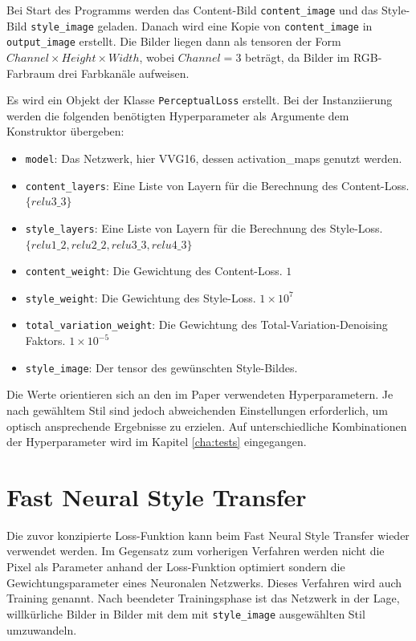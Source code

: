 Bei Start des Programms werden das Content-Bild \texttt{content_image} und das Style-Bild \texttt{style_image} geladen. Danach wird eine Kopie von \texttt{content_image} in \texttt{output_image} erstellt. Die Bilder liegen dann als \gls{tensor}en der Form $ Channel \times Height \times Width $, wobei $ Channel = 3 $ beträgt, da Bilder im RGB-Farbraum drei Farbkanäle aufweisen.

Es wird ein Objekt der Klasse \texttt{PerceptualLoss} erstellt. Bei der Instanziierung werden die folgenden benötigten Hyperparameter als Argumente dem Konstruktor übergeben:

\begin{itemize}
	\item \texttt{model}: Das Netzwerk, hier VVG16, dessen \gls{activation_map}s genutzt werden.
	\item \texttt{content_layers}: Eine Liste von Layern für die Berechnung des Content-Loss.\\ $ \{ relu3\_3 \} $
	\item \texttt{style_layers}: Eine Liste von Layern für die Berechnung des Style-Loss.\\ $ \{ relu1\_2, relu2\_2, relu3\_3, relu4\_3 \} $
	\item \texttt{content_weight}: Die Gewichtung des Content-Loss. $ 1 $ 
	\item \texttt{style_weight}: Die Gewichtung des Style-Loss. $ 1 \times 10^{7} $
	\item \texttt{total_variation_weight}: Die Gewichtung des Total-Variation-Denoising Faktors. $ 1 \times 10^{-5} $
	\item \texttt{style_image}: Der \gls{tensor} des gewünschten Style-Bildes.
\end{itemize}

Die Werte orientieren sich an den im Paper \cite{DBLP:journals/corr/JohnsonAL16} verwendeten Hyperparametern. Je nach gewähltem Stil sind jedoch abweichenden Einstellungen erforderlich, um optisch ansprechende Ergebnisse zu erzielen. Auf unterschiedliche Kombinationen der Hyperparameter wird im Kapitel \ref{cha:tests} eingegangen.

\section{Fast Neural Style Transfer}

Die zuvor konzipierte Loss-Funktion kann beim Fast Neural Style Transfer wieder verwendet werden. 
Im Gegensatz zum vorherigen Verfahren werden nicht die Pixel als Parameter anhand der Loss-Funktion optimiert sondern die Gewichtungsparameter eines Neuronalen Netzwerks. Dieses Verfahren wird auch Training genannt. Nach beendeter Trainingsphase ist das Netzwerk in der Lage, willkürliche Bilder in Bilder mit dem mit \texttt{style_image} ausgewählten Stil umzuwandeln.

